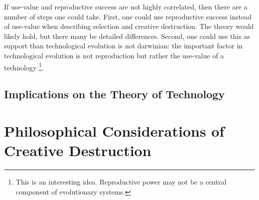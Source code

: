 \documentclass[11pt]{article}
\begin{document}
If use-value and reproductive success are not highly correlated, then there are a number of steps one could take.
First, one could use reproductive success instead of use-value when describing selection and creative destruction. 
The theory would likely hold, but there many be detailed differences. 
Second, one could use this as support than technological evolution is not darwinian: the important factor in technological evolution is not reproduction but rather the use-value of a technology
\footnote{This is an interesting idea. Reproductive power may not be a central component of evolutionary systems.}.




\subsection{Implications on the Theory of Technology}
\section{Philosophical Considerations of Creative Destruction}
\end{document}
